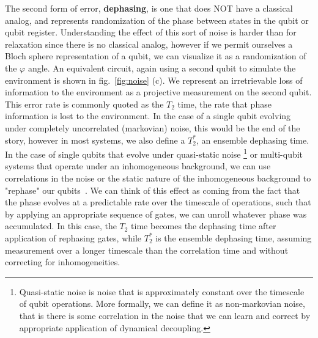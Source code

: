 The second form of error, \textbf{dephasing}, is one that does NOT have a classical analog, and represents randomization of the phase between
states in the qubit or qubit register. Understanding the effect of this sort of noise is harder than for relaxation since there is no
classical analog, however if we permit ourselves a Bloch sphere representation of a qubit, we can visualize it
as a randomization of the $\varphi$ angle. An equivalent circuit, again using a second qubit to simulate the
environment is shown in fig.~\ref{fig:noise} (c). We represent an irretrievable loss of information to the
environment as a projective measurement on the second qubit. This error rate is commonly quoted as the $T_2$ time,
the rate that phase information is lost to the environment. In the case of a single qubit evolving under completely uncorrelated
(markovian) noise, this would be the end of the story, however in most systems, we also define a $T_2^*$, an ensemble
dephasing time. In the case of single qubits that evolve under quasi-static noise
\footnote{Quasi-static noise is noise that is approximately constant over the timescale of qubit operations. More formally,
we can define it as non-markovian noise, that is there is some correlation in the noise that we can learn and correct
by appropriate application of dynamical decoupling.} or multi-qubit systems that operate
under an inhomogeneous background, we can use correlations in the noise or the static nature of the inhomogeneous background
to "rephase" our qubits~\cite{PhysRev.80.580,dynamic-decoupling-biercuk}. We can think of this effect as coming from the
fact that the phase evolves at a predictable rate over the timescale of operations, such that by applying an appropriate sequence
of gates, we can unroll whatever phase was accumulated.  In this case, the $T_2$ time becomes the dephasing time after
application of rephasing gates, while $T_2^*$ is the ensemble dephasing time, assuming measurement over a longer timescale
than the correlation time and without correcting for inhomogeneities.


